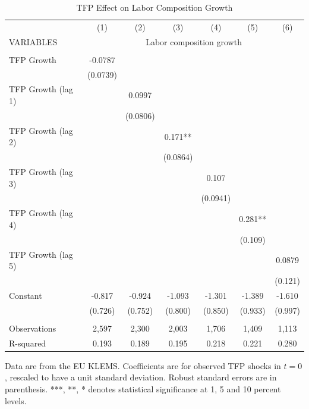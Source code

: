 \documentclass[12pt]{article}
\begin{document}
\begin{table}
\begin{center}
\scriptsize
\begin{tabular}{lcccccc} \hline \hline
 & (1) & (2) & (3) & (4) & (5) & (6)\\
VARIABLES & \multicolumn{6}{c}{Labor composition growth} \\ \hline
 &  &  &  &  &  &  \\
TFP Growth & -0.0787 &  &  &  &  &  \\
 & (0.0739) &  &  &  &  &  \\
TFP Growth (lag 1) &  & 0.0997 &  &  &  &  \\
 &  & (0.0806) &  &  &  &  \\
TFP Growth (lag 2) &  &  & 0.171** &  &  &  \\
 &  &  & (0.0864) &  &  &  \\
TFP Growth (lag 3) &  &  &  & 0.107 &  &  \\
 &  &  &  & (0.0941) &  &  \\
TFP Growth (lag 4) &  &  &  &  & 0.281** &  \\
 &  &  &  &  & (0.109) &  \\
TFP Growth (lag 5) &  &  &  &  &  & 0.0879 \\
 &  &  &  &  &  & (0.121) \\
Constant & -0.817 & -0.924 & -1.093 & -1.301 & -1.389 & -1.610 \\
 & (0.726) & (0.752) & (0.800) & (0.850) & (0.933) & (0.997) \\
 &  &  &  &  &  &  \\
Observations & 2,597 & 2,300 & 2,003 & 1,706 & 1,409 & 1,113 \\
 R-squared & 0.193 & 0.189 & 0.195 & 0.218 & 0.221 & 0.280 \\ \hline
\end{tabular}
\end{center}
\caption{TFP Effect on Labor Composition Growth}
\label{estimation2}
{\scriptsize Data are from the EU KLEMS. Coefficients are for observed TFP shocks in $t = 0$, rescaled to have a unit standard deviation. Robust standard errors are in parenthesis. ***, **, * denotes statistical significance at 1, 5 and 10 percent levels.}
\end{table}
\end{document}
